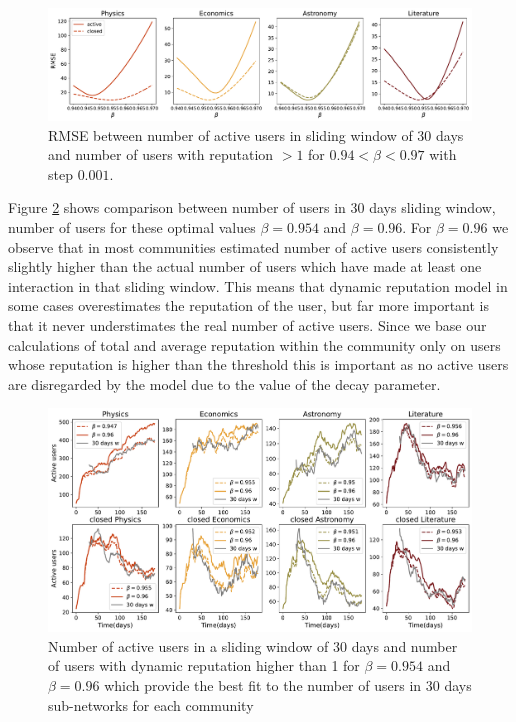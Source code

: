 \begin{figure}[h!]
	\centering
	\includegraphics[width=\linewidth]{figures/stackexchange/rmse.pdf}
	\caption{RMSE between number of active users in sliding window of 30 days and number of users with reputation $>1$ for  $0.94< \beta <0.97$ with step $0.001$. }
	\label{fig:rmse}
\end{figure}

Figure \ref{fig:nusers} shows comparison between number of users in 30 days sliding window, number of users for these optimal values $\beta = 0.954$ and $\beta =0.96$. For $\beta = 0.96$ we observe that in most communities estimated number of active users consistently slightly higher than the actual number of users which have made at least one interaction in that sliding window. This means that dynamic reputation model in some cases overestimates the reputation of the user, but far more important is that it never understimates the real number of active users. Since we base our calculations of total and average reputation within the community only on users whose reputation is higher than the threshold this is important as no active users are disregarded by the model due to the value of the decay parameter.

\begin{figure}[h!]
	\centering
	\includegraphics[width=\linewidth]{figures/stackexchange/active_users.pdf}
	\caption{Number of active users in a sliding window of 30 days and number of users with dynamic reputation higher than 1 for $\beta=0.954$ and $\beta=0.96 $ which provide the best fit to the number of users in 30 days sub-networks for each community}
	\label{fig:nusers}
\end{figure}

